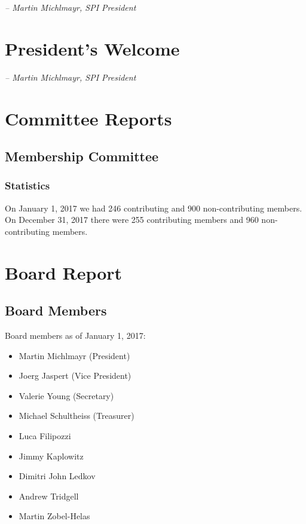\documentclass[a4paper]{report}
\begin{document}
  \emph{-- Martin Michlmayr, SPI President}

\newpage

\tableofcontents

\newpage

\chapter{President's Welcome}
\label{sec:president}

  \emph{-- Martin Michlmayr, SPI President}

\chapter{Committee Reports}
\section{Membership Committee}

\subsection{Statistics}

On January 1, 2017 we had 246 contributing and 900 non-contributing
members.  On December 31, 2017 there were 255 contributing members and
960 non-contributing members.

\chapter{Board Report}
\section{Board Members}

Board members as of January 1, 2017:

\begin{itemize}
\item Martin Michlmayr (President)
\item Joerg Jaspert (Vice President)
\item Valerie Young (Secretary)
\item Michael Schultheiss (Treasurer)
\item Luca Filipozzi
\item Jimmy Kaplowitz
\item Dimitri John Ledkov
\item Andrew Tridgell
\item Martin Zobel-Helas
\end{itemize}
\end{document}
